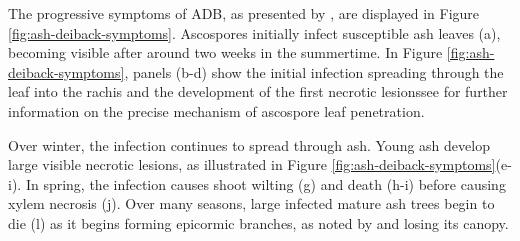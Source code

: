 The progressive symptoms of ADB, as presented by \cite{gross2014h}, are displayed in Figure \ref{fig:ash-deiback-symptoms}.
Ascospores initially infect susceptible ash leaves (a), 
becoming visible after around two weeks \cite{https://doi.org/10.1111/ppa.12048} in the summertime. 
In Figure \ref{fig:ash-deiback-symptoms}, panels (b-d) show the initial infection spreading through 
the leaf into the rachis and the development of the first necrotic lesions\textemdash see
\cite{https://doi.org/10.1111/ppa.12844} for further information on the precise mechanism of ascospore leaf penetration.

Over winter, the infection continues to spread through ash. 
Young ash develop large visible necrotic lesions, as illustrated in Figure \ref{fig:ash-deiback-symptoms}(e-i).
In spring, the infection causes shoot wilting (g) and death (h-i) before causing xylem necrosis (j).
Over many seasons, large infected mature ash trees begin to die (l) as it begins forming epicormic branches, 
as noted by \cite{marciulyniene2017can} and losing its canopy.

